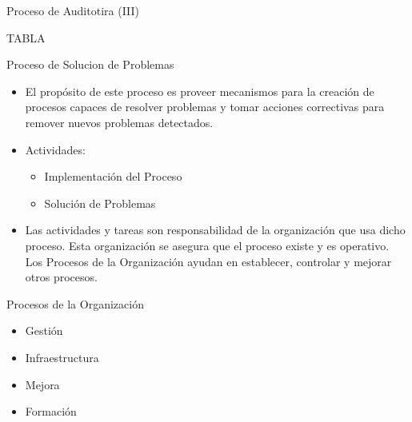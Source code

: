 \documentclass{beamer}
\begin{document}
			\begin{frame}{Proceso de Auditotira (III)}
			
			\huge TABLA
			
			\end{frame}
			
			\begin{frame}{Proceso de Solucion de Problemas}
				\begin{itemize}
					\item El propósito de este proceso es proveer mecanismos para la creación de procesos capaces de resolver problemas y tomar acciones correctivas para remover nuevos problemas detectados.
					\item Actividades:
			
						\begin{itemize}
							\item Implementación del Proceso
							\item Solución de Problemas
						\end{itemize}

				\end{itemize}			 
			\end{frame}
			
			\begin{frame}
			\begin{itemize}
			\item Las actividades y tareas son responsabilidad de la organización que usa dicho proceso. Esta organización se asegura que el proceso existe y es operativo. Los Procesos de la Organización ayudan en establecer, controlar y mejorar otros procesos.
			\end{itemize}
			
			\end{frame}
			
			\begin{frame}{Procesos de la Organización}
				\begin{itemize}
					\item Gestión
					\item Infraestructura
					\item Mejora
					\item Formación
				\end{itemize}
			\end{frame}
			
\end{document}
